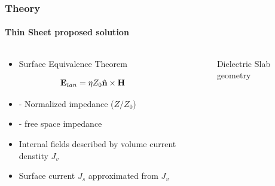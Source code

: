 \documentclass[mathserif,18pt,xcolor=table]{beamer}
\begin{document}
        \begin{frame}
          \frametitle{Theory}
          \framesubtitle{Thin Sheet proposed solution}
          \begin{columns}[T] %
            \begin{column}{.5\textwidth}
              \begin{itemize}
                \item{Surface Equivalence Theorem}
                \end{itemize}
                \begin{equation} \nonumber
                  \mathbf{E}_{tan} = \eta Z_0 \hat{\mathbf{n}} \times \mathbf{H}
                  \label{eq:eps}
                \end{equation}
                \begin{itemize}
                  \item[]{\makebox[.3cm][l]{$\eta$} - Normalized impedance ($Z/Z_0$)}
                  \item[]{ - free space impedance}
                \end{itemize}
                \begin{itemize}
                \item{Internal fields described by volume current denstity $J_v$}
                \item{Surface current $J_s$ approximated from $J_v$}
              \end{itemize}
            \end{column}
              \begin{column}[T]{.5\textwidth}
                \begin{figure}
                  \def\svgwidth{\linewidth}
                  
                  \caption{Dielectric Slab geometry}
                \end{figure}
              \end{column}%
            \end{columns}
          \end{frame}
\end{document}
